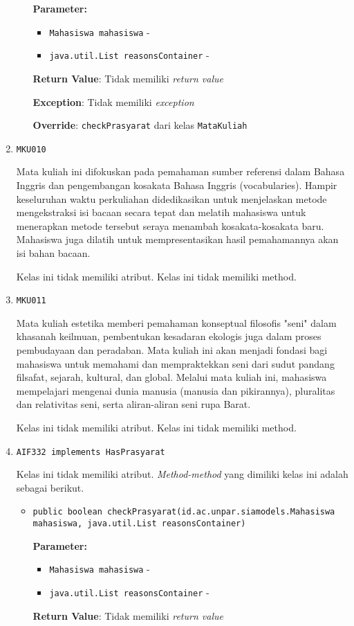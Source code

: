 \documentclass{article}
\begin{document}
\begin{enumerate}
\begin{itemize}
\textbf{Parameter:}
\begin{itemize}
\item \texttt{Mahasiswa mahasiswa} - 
\item \texttt{java.util.List reasonsContainer} - 
\end{itemize}
\textbf{Return Value}: Tidak memiliki \textit{return value}

\textbf{Exception}: Tidak memiliki \textit{exception}

\textbf{Override}: \texttt{checkPrasyarat} dari kelas \texttt{MataKuliah}

\end{itemize}
\item \texttt{MKU010}

Mata kuliah ini difokuskan pada pemahaman sumber referensi dalam Bahasa Inggris dan 
 pengembangan kosakata Bahasa Inggris (vocabularies). Hampir keseluruhan waktu perkuliahan 
 didedikasikan untuk menjelaskan metode mengekstraksi isi bacaan secara tepat dan melatih 
 mahasiswa untuk menerapkan metode tersebut seraya menambah kosakata-kosakata baru. 
 Mahasiswa juga dilatih untuk mempresentasikan hasil pemahamannya akan isi bahan bacaan.

Kelas ini tidak memiliki atribut. Kelas ini tidak memiliki method. \item \texttt{MKU011}

Mata kuliah estetika memberi pemahaman konseptual filosofis "seni" dalam khasanah keilmuan, 
 pembentukan kesadaran ekologis juga dalam proses pembudayaan dan peradaban. Mata kuliah ini 
 akan menjadi fondasi bagi mahasiswa untuk memahami dan mempraktekkan seni dari sudut pandang
 filsafat, sejarah, kultural, dan global. Melalui mata kuliah ini, mahasiswa mempelajari
 mengenai dunia manusia (manusia dan pikirannya), pluralitas dan relativitas seni, serta 
 aliran-aliran seni rupa Barat.

Kelas ini tidak memiliki atribut. Kelas ini tidak memiliki method. \item \texttt{AIF332 implements HasPrasyarat}



Kelas ini tidak memiliki atribut. \textit{Method-method} yang dimiliki kelas ini adalah sebagai berikut.
\begin{itemize}
\item \texttt{public boolean checkPrasyarat(id.ac.unpar.siamodels.Mahasiswa mahasiswa, java.util.List reasonsContainer)}

\textbf{Parameter:}
\begin{itemize}
\item \texttt{Mahasiswa mahasiswa} - 
\item \texttt{java.util.List reasonsContainer} - 
\end{itemize}
\textbf{Return Value}: Tidak memiliki \textit{return value}


\end{itemize}
\end{enumerate}
\end{document}
